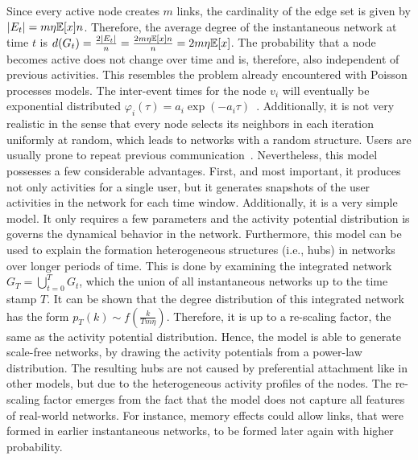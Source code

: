 Since every active node creates \(m\) links, the cardinality of the edge set is given by \(|E_{t}| = m \eta \mathbb{E}[{x}] n\).
Therefore, the average degree of the instantaneous network at time \(t\) is \(d(G_{t}) = \frac{2|E_{t}|}{n} = \frac{2 m \eta \mathbb{E}[{x}] n}{n} = 2 m \eta \mathbb{E}[{x}]\).
The probability that a node becomes active does not change over time and is, therefore, also independent of previous activities.
This resembles the problem already encountered with Poisson processes models.
The inter-event times for the node \(v_{i}\) will eventually be exponential distributed \(\varphi_{i}(\tau) = a_{i} \exp(-a_{i} \tau)\)~\cite{Moinet2016}.
Additionally, it is not very realistic in the sense that every node selects its neighbors in each iteration uniformly at random, which leads to networks with a random structure.
Users are usually prone to repeat previous communication~\cite{Karsai2014}.
Nevertheless, this model possesses a few considerable advantages.
First, and most important, it produces not only activities for a single user, but it generates snapshots of the user activities in the network for each time window.
Additionally, it is a very simple model.
It only requires a few parameters and the activity potential distribution is governs the dynamical behavior in the network.
Furthermore, this model can be used to explain the formation heterogeneous structures (i.e., hubs) in networks over longer periods of time.
This is done by examining the integrated network \(G_{T} = \bigcup_{t=0}^{T} G_{t}\), which the union of all instantaneous networks up to the time stamp \(T\).
It can be shown that the  degree distribution of this integrated network has the form \(p_{T}(k) \sim f(\frac{k}{T m \eta})\).
Therefore, it is up to a re-scaling factor, the same as the activity potential distribution.
Hence, the model is able to generate scale-free networks, by drawing the activity potentials from a power-law distribution.
The resulting hubs are not caused by preferential attachment like in other models, but due to the heterogeneous activity profiles of the nodes.
The re-scaling factor emerges from the fact that the model does not capture all features of real-world networks.
For instance, memory effects could allow links, that were formed in earlier instantaneous networks, to be formed later again with higher probability.

